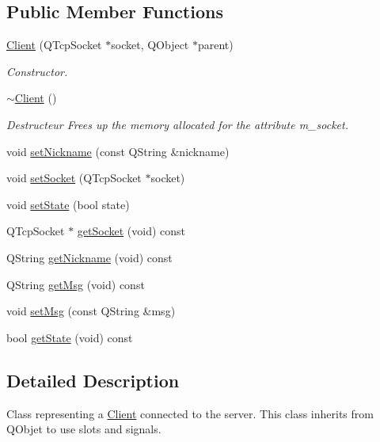 \subsection*{Public Member Functions}
\begin{DoxyCompactItemize}
\item 
\hyperlink{class_client_a3fee5c9221e495d09569c2f4c6bce53c}{Client} (Q\-Tcp\-Socket $\ast$socket, Q\-Object $\ast$parent)
\begin{DoxyCompactList}\small\item\em Constructor. \end{DoxyCompactList}\item 
\hypertarget{class_client_a840e519ca781888cbd54181572ebe3a7}{\hyperlink{class_client_a840e519ca781888cbd54181572ebe3a7}{$\sim$\-Client} ()}\label{class_client_a840e519ca781888cbd54181572ebe3a7}

\begin{DoxyCompactList}\small\item\em Destructeur Frees up the memory allocated for the attribute m\-\_\-socket. \end{DoxyCompactList}\item 
void \hyperlink{class_client_aa7ae88fd3971f253df4e8a7f591b6c88}{set\-Nickname} (const Q\-String \&nickname)
\item 
void \hyperlink{class_client_a559b3d6b01f9ab3a2934d6ef0c383dd6}{set\-Socket} (Q\-Tcp\-Socket $\ast$socket)
\item 
void \hyperlink{class_client_a81c338aeab1f6bfd7b6e9a879c6db453}{set\-State} (bool state)
\item 
Q\-Tcp\-Socket $\ast$ \hyperlink{class_client_a67454714bbf369688416444223ed47e7}{get\-Socket} (void) const 
\item 
Q\-String \hyperlink{class_client_a8659e4aa0cbdce7d8b2bd6cc3c99ac05}{get\-Nickname} (void) const 
\item 
Q\-String \hyperlink{class_client_a822851376ab4c8418c7bad3adfe1d333}{get\-Msg} (void) const 
\item 
void \hyperlink{class_client_a193f44e7d464f66588a3ae83f660a788}{set\-Msg} (const Q\-String \&msg)
\item 
bool \hyperlink{class_client_a7b31bb783d4b1d0ff34121b788bf7a9f}{get\-State} (void) const 
\end{DoxyCompactItemize}


\subsection{Detailed Description}
Class representing a \hyperlink{class_client}{Client} connected to the server. This class inherits from Q\-Objet to use slots and signals. 


